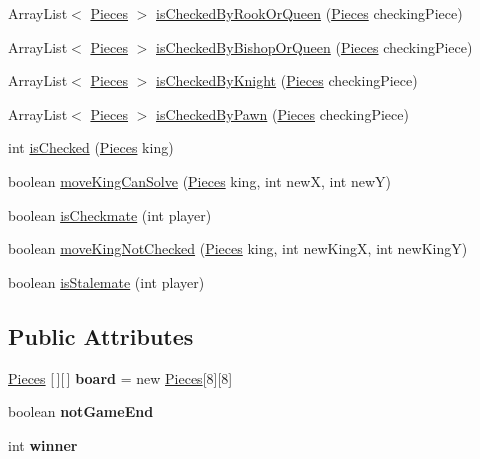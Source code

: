 \begin{DoxyCompactItemize}
\item 
Array\+List$<$ \mbox{\hyperlink{classmain_1_1_pieces}{Pieces}} $>$ \mbox{\hyperlink{classmain_1_1_board_aeae5c2e64b2030c15c915b8a8f60a224}{is\+Checked\+By\+Rook\+Or\+Queen}} (\mbox{\hyperlink{classmain_1_1_pieces}{Pieces}} checking\+Piece)
\item 
Array\+List$<$ \mbox{\hyperlink{classmain_1_1_pieces}{Pieces}} $>$ \mbox{\hyperlink{classmain_1_1_board_a9f09fd303ca3099fd484f62dfad93835}{is\+Checked\+By\+Bishop\+Or\+Queen}} (\mbox{\hyperlink{classmain_1_1_pieces}{Pieces}} checking\+Piece)
\item 
Array\+List$<$ \mbox{\hyperlink{classmain_1_1_pieces}{Pieces}} $>$ \mbox{\hyperlink{classmain_1_1_board_aff11960be7cf5b8b39099b830dfcff03}{is\+Checked\+By\+Knight}} (\mbox{\hyperlink{classmain_1_1_pieces}{Pieces}} checking\+Piece)
\item 
Array\+List$<$ \mbox{\hyperlink{classmain_1_1_pieces}{Pieces}} $>$ \mbox{\hyperlink{classmain_1_1_board_adced662a6dafccc6a509a9fb0b699018}{is\+Checked\+By\+Pawn}} (\mbox{\hyperlink{classmain_1_1_pieces}{Pieces}} checking\+Piece)
\item 
int \mbox{\hyperlink{classmain_1_1_board_a873fc556e24347e49daad1e98a4bebee}{is\+Checked}} (\mbox{\hyperlink{classmain_1_1_pieces}{Pieces}} king)
\item 
boolean \mbox{\hyperlink{classmain_1_1_board_a6ab08edc59391aee14129836dd9995a4}{move\+King\+Can\+Solve}} (\mbox{\hyperlink{classmain_1_1_pieces}{Pieces}} king, int newX, int newY)
\item 
boolean \mbox{\hyperlink{classmain_1_1_board_a8b249e2cc598b8255fa95047f918fbf8}{is\+Checkmate}} (int player)
\item 
boolean \mbox{\hyperlink{classmain_1_1_board_a0a6a45c4aab0e22538dbe2247e0fbb71}{move\+King\+Not\+Checked}} (\mbox{\hyperlink{classmain_1_1_pieces}{Pieces}} king, int new\+KingX, int new\+KingY)
\item 
boolean \mbox{\hyperlink{classmain_1_1_board_a4d337e9fc0aa574b694f3421d5d076d9}{is\+Stalemate}} (int player)
\end{DoxyCompactItemize}
\subsection*{Public Attributes}
\begin{DoxyCompactItemize}
\item 
\mbox{\label{classmain_1_1_board_ac7de2d1c025a147f1be11e3ce0ddf807}} 
\mbox{\hyperlink{classmain_1_1_pieces}{Pieces}} \mbox{[}$\,$\mbox{]}\mbox{[}$\,$\mbox{]} {\bfseries board} = new \mbox{\hyperlink{classmain_1_1_pieces}{Pieces}}\mbox{[}8\mbox{]}\mbox{[}8\mbox{]}
\item 
\mbox{\label{classmain_1_1_board_aa738f2c6b2596cc6981129e9fb216db8}} 
boolean {\bfseries not\+Game\+End}
\item 
\mbox{\label{classmain_1_1_board_aa9469f166fe8c4af611a11372d57a1be}} 
int {\bfseries winner}
\end{DoxyCompactItemize}



